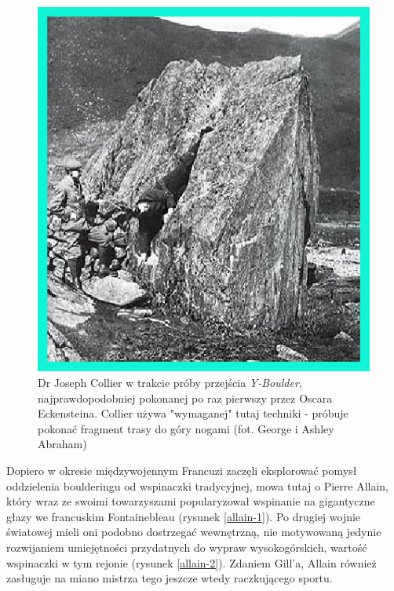 \documentclass{article}
\begin{document}
\begin{figure}[!htbp]
	\begin{center}
		\includegraphics[width=0.7\linewidth]{images/y-boulder-collier.eps}
	\end{center}
	\caption{Dr Joseph Collier w trakcie próby przejścia \textit{Y-Boulder}, najprawdopodobniej pokonanej po raz pierwszy przez Oscara Eckensteina. Collier używa "wymaganej" tutaj techniki - próbuje pokonać fragment trasy do góry nogami (fot. George i Ashley Abraham) \cite{gill-history}}
	\label{collier}
\end{figure}

Dopiero w okresie międzywojennym Francuzi zaczęli eksplorować pomysł oddzielenia boulderingu od wspinaczki tradycyjnej, mowa tutaj o Pierre Allain, który wraz ze swoimi towarzyszami popularyzował wspinanie na gigantyczne głazy we francuskim Fontainebleau (rysunek \ref{allain-1}). Po drugiej wojnie światowej mieli oni podobno dostrzegać wewnętrzną, nie motywowaną jedynie rozwijaniem umiejętności przydatnych do wypraw wysokogórskich, wartość wspinaczki w tym rejonie (rysunek \ref{allain-2}). Zdaniem Gill'a, Allain również zasługuje na miano mistrza tego jeszcze wtedy raczkującego sportu.
\end{document}
